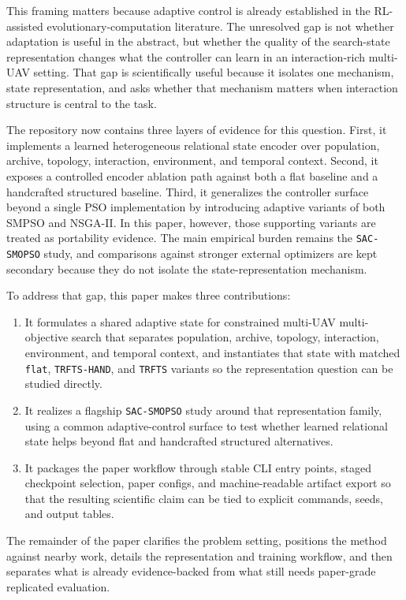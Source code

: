 \documentclass[a4paper,fleqn]{cas-sc}
\begin{document}
This framing matters because adaptive control is already established in the RL-assisted evolutionary-computation literature. The unresolved gap is not whether adaptation is useful in the abstract, but whether the quality of the search-state representation changes what the controller can learn in an interaction-rich multi-UAV setting. That gap is scientifically useful because it isolates one mechanism, state representation, and asks whether that mechanism matters when interaction structure is central to the task.

The repository now contains three layers of evidence for this question. First, it implements a learned heterogeneous relational state encoder over population, archive, topology, interaction, environment, and temporal context. Second, it exposes a controlled encoder ablation path against both a flat baseline and a handcrafted structured baseline. Third, it generalizes the controller surface beyond a single PSO implementation by introducing adaptive variants of both SMPSO and NSGA-II. In this paper, however, those supporting variants are treated as portability evidence. The main empirical burden remains the \texttt{SAC-SMOPSO} study, and comparisons against stronger external optimizers are kept secondary because they do not isolate the state-representation mechanism.

To address that gap, this paper makes three contributions:
\begin{enumerate}
\item It formulates a shared adaptive state for constrained multi-UAV multi-objective search that separates population, archive, topology, interaction, environment, and temporal context, and instantiates that state with matched \texttt{flat}, \texttt{TRFTS-HAND}, and \texttt{TRFTS} variants so the representation question can be studied directly.
\item It realizes a flagship \texttt{SAC-SMOPSO} study around that representation family, using a common adaptive-control surface to test whether learned relational state helps beyond flat and handcrafted structured alternatives.
\item It packages the paper workflow through stable CLI entry points, staged checkpoint selection, paper configs, and machine-readable artifact export so that the resulting scientific claim can be tied to explicit commands, seeds, and output tables.
\end{enumerate}

The remainder of the paper clarifies the problem setting, positions the method against nearby work, details the representation and training workflow, and then separates what is already evidence-backed from what still needs paper-grade replicated evaluation.
\end{document}
